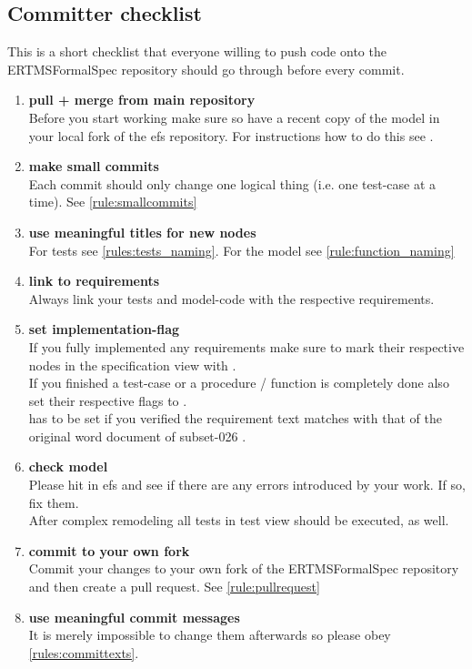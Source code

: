 \documentclass[draft]{efsguide}
\begin{document}
\begin{appendices}

\chapter{Committer checklist}
\label{appendix:committer_checklist}
This is a short checklist that everyone willing to push code onto the ERTMSFormalSpec repository should go through before every commit.

\begin{enumerate}
\item \textbf{pull + merge from main repository}\\
Before you start working make sure so have a recent copy of the model in your local fork of the \gls{efs} repository. For instructions how to do this see \cite{gitworkflow}. 
\item \textbf{make small commits}\\
Each commit should only change one logical thing (i.e. one test-case at a time). See \ref{rule:smallcommits} 
\item \textbf{use meaningful titles for new nodes}\\
For tests see \ref{rules:tests_naming}. For the model see \ref{rule:function_naming} 
\item \textbf{link to requirements}\\
Always link your tests and model-code with the respective requirements. 
\item \textbf{set implementation-flag}\\
If you fully implemented any requirements make sure to mark their respective nodes in the specification view with .\\
If you finished a test-case or a procedure / function is completely done also set their respective flags to .\\
  has to be set if you verified the requirement text matches with that of the original word document of subset-026 \cite{subset26}. 
\item \textbf{check model}\\
Please hit  in \gls{efs} and see if there are any errors introduced by your work. If so, fix them.\\
After complex remodeling all tests in test view should be executed, as well.
\item \textbf{commit to your own fork}\\
Commit your changes to your own fork of the ERTMSFormalSpec repository and then create a pull request. See \ref{rule:pullrequest} 
\item \textbf{use meaningful commit messages}\\
It is merely impossible to change them afterwards so please obey \ref{rules:committexts}. 
\end{enumerate}


\end{appendices}
\end{document}
